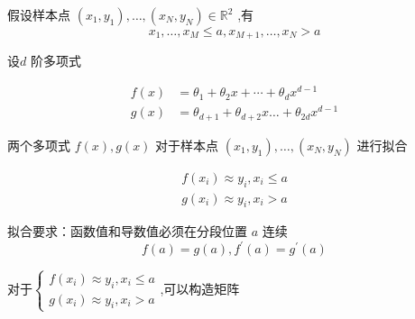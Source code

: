 \begin{problem}
    假设样本点 $ \left(x_{1}, y_{1}\right), \ldots,\left(x_{N}, y_{N}\right) \in \mathbb{R}^{2} $ ,有 \begin{equation} x_{1}, \ldots, x_{M} \leq a , x_{M+1}, \ldots, x_{N}>a\end{equation}

    设$ {d} $ 阶多项式 

    \begin{equation}
    \begin{aligned}
        f(x)&=\theta_{1}+\theta_{2} x+\cdots+\theta_{d} x^{d-1}\\
        g(x)&=\theta_{d+1}+\theta_{d+2} x \ldots+\theta_{2 d} x^{d-1}
    \end{aligned}
    \end{equation}

    两个多项式 $ f(x), g(x) $ 对于样本点 $ \left(x_{1}, y_{1}\right), \ldots,\left(x_{N}, y_{N}\right) $ 进行拟合

    \begin{equation}
    \begin{array}{l}
    f\left(x_{i}\right) \approx y_{i}, x_{i} \leq a \\
    g\left(x_{i}\right) \approx y_{i}, x_{i}>a
    \end{array}
    \end{equation}

    拟合要求：函数值和导数值必须在分段位置 $ a $ 连续
    \begin{equation}
    f(a)=g(a), f^{\prime}(a)=g^{\prime}(a)
    \end{equation}
\end{problem}

对于$
\left\{
    \begin{array}{l}
f\left(x_{i}\right) \approx y_{i}, x_{i} \leq a \\
g\left(x_{i}\right) \approx y_{i}, x_{i}>a
\end{array}
\right.
$,可以构造矩阵

